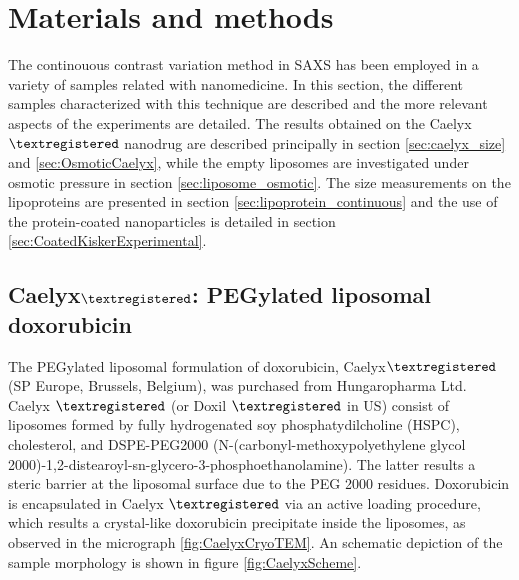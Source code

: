 \section{Materials and methods}

The continouous contrast variation method in SAXS has been employed in a variety of samples related with nanomedicine. In this section, the different samples characterized with this technique are described and the more relevant aspects of the experiments are detailed. The results obtained on the Caelyx$\textregistered$ nanodrug are described principally in section \ref{sec:caelyx_size} and \ref{sec:OsmoticCaelyx}, while the empty liposomes are investigated under osmotic pressure in section \ref{sec:liposome_osmotic}. The size measurements on the lipoproteins are presented in section \ref{sec:lipoprotein_continuous} and the use of the protein-coated nanoparticles is detailed in section \ref{sec:CoatedKiskerExperimental}.

\subsection{Caelyx$\textregistered$: PEGylated liposomal doxorubicin}
\label{sec:materials_caelyx}
The PEGylated liposomal formulation of doxorubicin, Caelyx$\textregistered$ (SP Europe, Brussels, Belgium), was purchased from Hungaropharma Ltd. Caelyx $\textregistered$ (or Doxil $\textregistered$ in US) consist of liposomes formed by fully hydrogenated soy phosphatydilcholine (HSPC), cholesterol, and DSPE-PEG2000 (N-(carbonyl-methoxypolyethylene glycol 2000)-1,2-distearoyl-sn-glycero-3-phosphoethanolamine). The latter results a steric barrier at the liposomal surface due to the PEG 2000 residues. Doxorubicin is encapsulated in Caelyx $\textregistered$ via an active loading procedure, which results a crystal-like doxorubicin precipitate inside the liposomes, as observed in the micrograph \ref{fig:CaelyxCryoTEM}. An schematic depiction of the sample morphology is shown in figure \ref{fig:CaelyxScheme}. 

